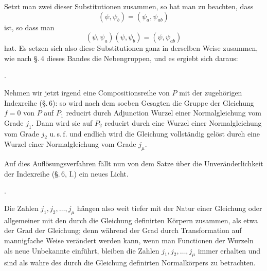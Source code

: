 
Setzt man zwei dieser Substitutionen zusammen, so hat man zu beachten, dass
\[
(\psi, \psi_b) = (\psi_a, \psi_{ab})
\]
ist, so dass man
\[
(\psi, \psi_a)(\psi, \psi_b) = (\psi, \psi_{ab})
\]
hat. Es setzen sich also diese Substitutionen ganz in derselben Weise zusammen, wie
nach \S.\,4 dieses Bandes die Nebengruppen, und es ergiebt sich daraus:

. 

Nehmen wir jetzt irgend eine Compositionsreihe von $P$ mit der zugeh\"origen
Indexreihe (\S.\,6):
so wird nach dem soeben Gesagten die Gruppe der Gleichung $f = 0$ von $P$ auf $P_1$
reducirt durch Adjunction  Wurzel einer Normalgleichung vom Grade $j_1$. Dann
wird sie auf $P_2$ reducirt durch eine Wurzel einer Normalgleichung vom Grade $j_2$
u.\,s.\,f. und endlich wird die Gleichung vollst\"andig gel\"ost durch eine Wurzel
einer Normalgleichung vom Grade $j_\mu$.

Auf dies Aufl\"osungsverfahren f\"allt nun von dem Satze \"uber die
Unver\"anderlichkeit der Indexreihe (\S.\,6, I.) ein neues Licht.

. 

Die Zahlen $j_1, j_2, \ldots, j_\mu$ h\"angen also weit tiefer mit der Natur einer
Gleichung oder allgemeiner mit den durch die Gleichung definirten K\"orpern zusammen,
als etwa der Grad der Gleichung; denn w\"ahrend der Grad durch Transformation auf
mannigfache Weise ver\"andert werden kann, wenn man Functionen der Wurzeln als neue
Unbekannte einf\"uhrt, bleiben die Zahlen $j_1, j_2, \ldots, j_\mu$ immer erhalten und
sind als wahre  des durch die Gleichung definirten
Normalk\"orpers zu betrachten.
